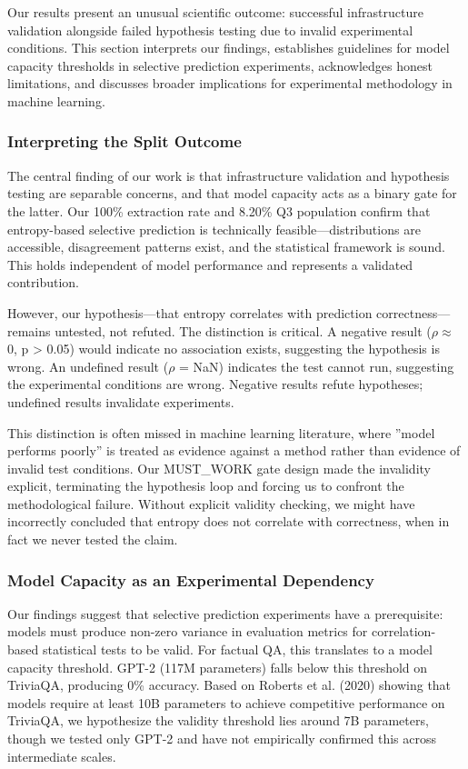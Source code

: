
Our results present an unusual scientific outcome: successful infrastructure validation alongside failed hypothesis testing due to invalid experimental conditions. This section interprets our findings, establishes guidelines for model capacity thresholds in selective prediction experiments, acknowledges honest limitations, and discusses broader implications for experimental methodology in machine learning.

\subsubsection{Interpreting the Split Outcome}

The central finding of our work is that infrastructure validation and hypothesis testing are separable concerns, and that model capacity acts as a binary gate for the latter. Our 100\% extraction rate and 8.20\% Q3 population confirm that entropy-based selective prediction is technically feasible---distributions are accessible, disagreement patterns exist, and the statistical framework is sound. This holds independent of model performance and represents a validated contribution.

However, our hypothesis---that entropy correlates with prediction correctness---remains untested, not refuted. The distinction is critical. A negative result ($\rho \approx$ 0, p > 0.05) would indicate no association exists, suggesting the hypothesis is wrong. An undefined result ($\rho$ = NaN) indicates the test cannot run, suggesting the experimental conditions are wrong. Negative results refute hypotheses; undefined results invalidate experiments.

This distinction is often missed in machine learning literature, where ''model performs poorly'' is treated as evidence against a method rather than evidence of invalid test conditions. Our MUST\_WORK gate design made the invalidity explicit, terminating the hypothesis loop and forcing us to confront the methodological failure. Without explicit validity checking, we might have incorrectly concluded that entropy does not correlate with correctness, when in fact we never tested the claim.

\subsubsection{Model Capacity as an Experimental Dependency}

Our findings suggest that selective prediction experiments have a prerequisite: models must produce non-zero variance in evaluation metrics for correlation-based statistical tests to be valid. For factual QA, this translates to a model capacity threshold. GPT-2 (117M parameters) falls below this threshold on TriviaQA, producing 0\% accuracy. Based on Roberts et al. (2020) showing that models require at least 10B parameters to achieve competitive performance on TriviaQA, we hypothesize the validity threshold lies around 7B parameters, though we tested only GPT-2 and have not empirically confirmed this across intermediate scales.

